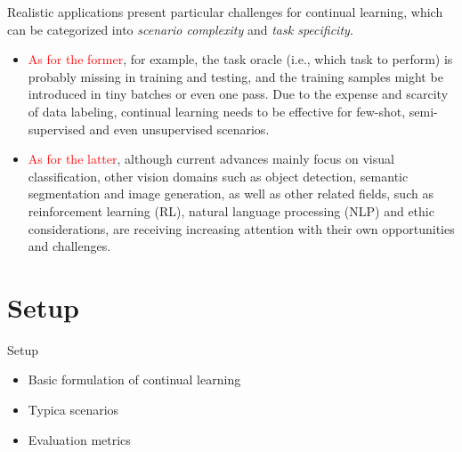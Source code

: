 \documentclass[9pt,dvipsnames]{beamer}
\begin{document}
\begin{frame}
    Realistic applications present particular challenges for continual learning, which can be categorized into \textit{scenario complexity} and \textit{task specificity}.
    \begin{itemize}
        \item \textcolor{red}{As for the former}, for example, the task oracle (i.e., which task to perform) is probably missing in training and testing, and the training samples might be introduced in tiny batches or even one pass. Due to the expense and scarcity of data labeling, continual learning needs to be effective for few-shot, semi-supervised and even unsupervised scenarios.
        \item \textcolor{red}{As for the latter}, although current advances mainly focus on visual classification, other vision domains such as object detection, semantic segmentation and image generation, as well as other related fields, such as reinforcement learning (RL), natural language processing (NLP) and ethic considerations, are receiving increasing attention with their own opportunities and challenges.
    \end{itemize}
\end{frame}

\section{Setup}
\begin{frame}{Setup}
    \begin{itemize}
        \item Basic formulation of continual learning
        \item Typica scenarios
        \item Evaluation metrics
    \end{itemize}
\end{frame}
\end{document}
